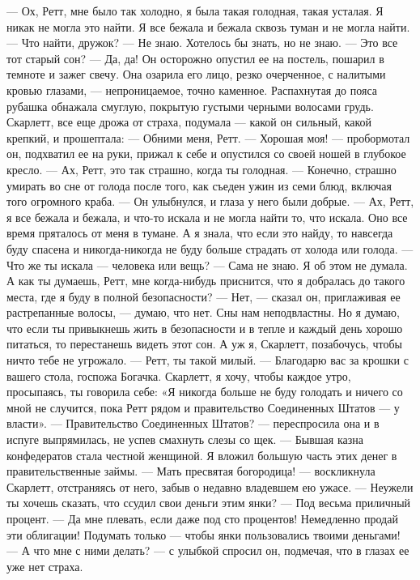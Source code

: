 — Ох, Ретт, мне было так холодно, я была такая голодная, такая усталая. Я никак не могла это найти. Я все бежала и бежала сквозь туман и не могла найти.
— Что найти, дружок?
— Не знаю. Хотелось бы знать, но не знаю.
— Это все тот старый сон?
— Да, да!
Он осторожно опустил ее на постель, пошарил в темноте и зажег свечу. Она озарила его лицо, резко очерченное, с налитыми кровью глазами, — непроницаемое, точно каменное. Распахнутая до пояса рубашка обнажала смуглую, покрытую густыми черными волосами грудь. Скарлетт, все еще дрожа от страха, подумала — какой он сильный, какой крепкий, и прошептала:
— Обними меня, Ретт.
— Хорошая моя! — пробормотал он, подхватил ее на руки, прижал к себе и опустился со своей ношей в глубокое кресло.
— Ах, Ретт, это так страшно, когда ты голодная.
— Конечно, страшно умирать во сне от голода после того, как съеден ужин из семи блюд, включая того огромного краба. — Он улыбнулся, и глаза у него были добрые.
— Ах, Ретт, я все бежала и бежала, и что-то искала и не могла найти то, что искала. Оно все время пряталось от меня в тумане. А я знала, что если это найду, то навсегда буду спасена и никогда-никогда не буду больше страдать от холода или голода.
— Что же ты искала — человека или вещь?
— Сама не знаю. Я об этом не думала. А как ты думаешь, Ретт, мне когда-нибудь приснится, что я добралась до такого места, где я буду в полной безопасности?
— Нет, — сказал он, приглаживая ее растрепанные волосы, — думаю, что нет. Сны нам неподвластны. Но я думаю, что если ты привыкнешь жить в безопасности и в тепле и каждый день хорошо питаться, то перестанешь видеть этот сон. А уж я, Скарлетт, позабочусь, чтобы ничто тебе не угрожало.
— Ретт, ты такой милый.
— Благодарю вас за крошки с вашего стола, госпожа Богачка. Скарлетт, я хочу, чтобы каждое утро, просыпаясь, ты говорила себе: «Я никогда больше не буду голодать и ничего со мной не случится, пока Ретт рядом и правительство Соединенных Штатов — у власти».
— Правительство Соединенных Штатов? — переспросила она и в испуге выпрямилась, не успев смахнуть слезы со щек.
— Бывшая казна конфедератов стала честной женщиной. Я вложил большую часть этих денег в правительственные займы.
— Мать пресвятая богородица! — воскликнула Скарлетт, отстраняясь от него, забыв о недавно владевшем ею ужасе. — Неужели ты хочешь сказать, что ссудил свои деньги этим янки?
— Под весьма приличный процент.
— Да мне плевать, если даже под сто процентов! Немедленно продай эти облигации! Подумать только — чтобы янки пользовались твоими деньгами!
— А что мне с ними делать? — с улыбкой спросил он, подмечая, что в глазах ее уже нет страха.
